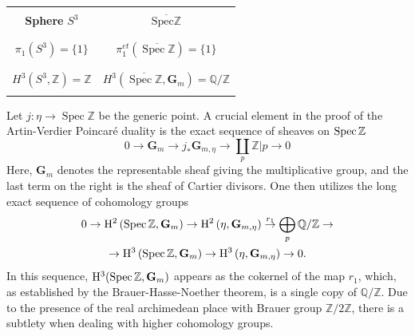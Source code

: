 \documentclass[letterpaper,11pt]{article}
\def\Spec{{\rm Spec\,}}
\def\Q{{\mathbb Q}}
\def\Z{\mathbb{Z}}
\theoremstyle{plain}
\begin{document}
\begin{center}
\renewcommand{\arraystretch}{0.5}
\begin{tabular}{c |c}
&\\ \textbf{Sphere} $S^3$ &  $\overline{\text{Spec}\mathbb{Z}}$ \\
 & \\
\hline 
& \\$\pi_1\left(S^3\right)=\{1\}$ & $\pi_1^{e t}(\overline{\operatorname{Spec} \mathbb{Z}})=\{1\}$ \\
& \\
& \\$H^3\left(S^3, \mathbb{Z}\right)=\mathbb{Z}$ & $H^3\left(\overline{\operatorname{Spec} \mathbb{Z}}, \mathbf{G}_m\right)=\mathbb{Q} / \mathbb{Z}$ \\ & \\
\end{tabular}
\end{center}
 \vspace{0.4cm}
 
  
 Let $j: \eta \rightarrow \operatorname{Spec} \mathbb{Z}$ be the generic point. A crucial element in the proof of the Artin-Verdier Poincar\'e duality is the exact sequence of sheaves on $\Spec \Z$
 $$
0 \rightarrow \mathbf{G}_m \rightarrow j_* \mathbf{G}_{m, \eta} \rightarrow \coprod_p \mathbb{Z}{\mid\!p} \rightarrow 0
$$
Here, $\mathbf{G}_m$ denotes the representable sheaf giving the multiplicative group, and the last term on the right is the sheaf of Cartier divisors. 
One then utilizes 
the long exact sequence of cohomology groups
$$
\begin{gathered}
0 \rightarrow \mathrm{H}^2\left(\Spec \Z, \mathbf{G}_{m}\right) \rightarrow \mathrm{H}^2\left(\eta, \mathbf{G}_{m, \eta}\right) \stackrel{r_1}{\rightarrow} \bigoplus_p \Q / \Z\rightarrow \\ \rightarrow \mathrm{H}^3\left(\Spec \Z, \mathbf{G}_{m}\right) \rightarrow \mathrm{H}^3\left(\eta, \mathbf{G}_{m, \eta}\right) \rightarrow 0.\end{gathered}
$$
In this sequence,  $\mathrm{H}^3(\Spec \Z, \mathbf{G}_{m})$ appears as the cokernel of the map $r_1$, which, as established by the Brauer-Hasse-Noether theorem, is a single copy of $\Q/\Z$. Due to the presence of the real archimedean place with Brauer group $\Z/2\Z$, there is a subtlety when dealing with higher cohomology groups. 
 
\end{document}
